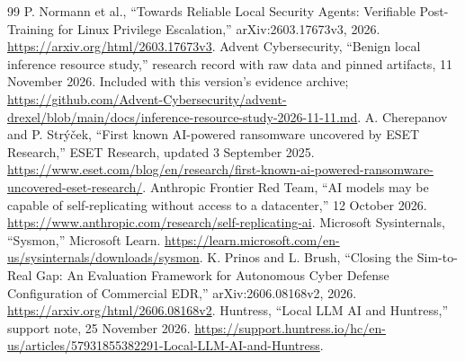 \documentclass[11pt,letterpaper]{article}
\begin{document}
\begin{thebibliography}{99}
 P. Normann et al., ``Towards Reliable Local Security Agents: Verifiable Post-Training for Linux Privilege Escalation,'' arXiv:2603.17673v3, 2026. \url{https://arxiv.org/html/2603.17673v3}.
 Advent Cybersecurity, ``Benign local inference resource study,'' research record with raw data and pinned artifacts, 11 November 2026. Included with this version's evidence archive; \url{https://github.com/Advent-Cybersecurity/advent-drexel/blob/main/docs/inference-resource-study-2026-11-11.md}.
 A. Cherepanov and P. Str\'y\v{c}ek, ``First known AI-powered ransomware uncovered by ESET Research,'' ESET Research, updated 3 September 2025. \url{https://www.eset.com/blog/en/research/first-known-ai-powered-ransomware-uncovered-eset-research/}.
 Anthropic Frontier Red Team, ``AI models may be capable of self-replicating without access to a datacenter,'' 12 October 2026. \url{https://www.anthropic.com/research/self-replicating-ai}.
 Microsoft Sysinternals, ``Sysmon,'' Microsoft Learn. \url{https://learn.microsoft.com/en-us/sysinternals/downloads/sysmon}.
 K. Prinos and L. Brush, ``Closing the Sim-to-Real Gap: An Evaluation Framework for Autonomous Cyber Defense Configuration of Commercial EDR,'' arXiv:2606.08168v2, 2026. \url{https://arxiv.org/html/2606.08168v2}.
 Huntress, ``Local LLM AI and Huntress,'' support note, 25 November 2026. \url{https://support.huntress.io/hc/en-us/articles/57931855382291-Local-LLM-AI-and-Huntress}.
\end{thebibliography}
\endgroup
\end{document}
